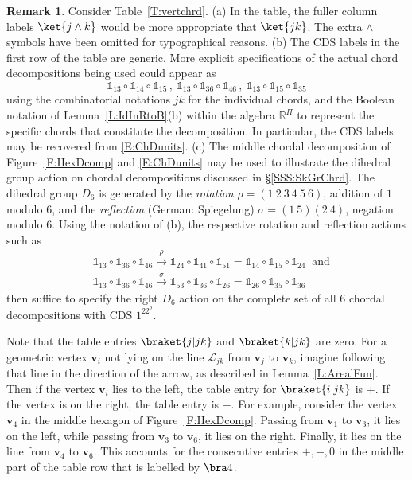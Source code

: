\documentclass[12pt]{amsart}
\theoremstyle{plain}
\theoremstyle{definition}
\newtheorem{remark}[theorem]{Remark}
\numberwithin{equation}{section}
\begin{document}
\begin{remark}\label{R:VerChTab}
Consider Table~\ref{T:vertchrd}.
\vskip 2mm
\noindent
(a)
In the table, the fuller column labels $\ket{j\wedge k}$ would be more appropriate that $\ket{jk}$. The extra $\wedge$ symbols have been omitted for typographical reasons.
\vskip 2mm
\noindent
(b)
The CDS labels in the first row of the table are generic. More explicit specifications of the actual chord decompositions being used could appear as
\begin{equation}\label{E:ChDunits}
\mathds 1_{13}\circ\mathds 1_{14}\circ\mathds 1_{15}\,,\
\mathds 1_{13}\circ\mathds 1_{36}\circ\mathds 1_{46}\,,\
\mathds 1_{13}\circ\mathds 1_{15}\circ\mathds 1_{35}
\end{equation}
using the combinatorial notations $jk$ for the individual chords, and the Boolean notation of Lemma~\ref{L:IdInRtoB}(b) within the algebra $\mathbb R^\Pi$ to represent the specific chords that constitute the decomposition. In particular, the CDS labels may be recovered from \eqref{E:ChDunits}.
\vskip 2mm
\noindent
(c)
The middle chordal decomposition of Figure~\ref{F:HexDcomp} and \eqref{E:ChDunits} may be used to illustrate the dihedral group action on chordal decompositions discussed in \S\ref{SSS:SkGrChrd}. The dihedral group $D_6$ is generated by the \emph{rotation} $\rho=(1\ 2\ 3\ 4\ 5\ 6)$, addition of $1$ modulo $6$, and the \emph{reflection} (German: Spiegelung) $\sigma=(1\ 5)(2\ 4)$, negation modulo $6$. Using the notation of (b), the respective rotation and reflection actions such as
\begin{align*}
&
\mathds 1_{13}\circ\mathds 1_{36}\circ\mathds 1_{46}
\overset{\rho}{\mapsto}
\mathds 1_{24}\circ\mathds 1_{41}\circ\mathds 1_{51}
=
\mathds 1_{14}\circ\mathds 1_{15}\circ\mathds 1_{24}
\
\mbox{ and}
\\
&
\mathds 1_{13}\circ\mathds 1_{36}\circ\mathds 1_{46}
\overset{\sigma}{\mapsto}
\mathds 1_{53}\circ\mathds 1_{36}\circ\mathds 1_{26}
=
\mathds 1_{26}\circ\mathds 1_{35}\circ\mathds 1_{36}
\end{align*}
then suffice to specify the right $D_6$ action on the complete set of all $6$ chordal decompositions with CDS $1^22^2$.
\end{remark}




Note that the table entries $\braket{j|jk}$ and $\braket{k|jk}$ are zero. For a geometric vertex $\mathbf v_i$ not lying on the line $\mathcal L_{jk}$ from $\mathbf v_j$ to $\mathbf v_k$, imagine following that line in the direction of the arrow, as described in Lemma~\ref{L:ArealFun}. Then if the vertex $\mathbf v_i$ lies to the left, the table entry for $\braket{i|jk}$ is $+$. If the vertex is on the right, the table entry is $-$. For example, consider the vertex $\mathbf v_4$ in the middle hexagon of Figure~\ref{F:HexDcomp}. Passing from $\mathbf v_1$ to $\mathbf v_3$, it lies on the left, while passing from $\mathbf v_3$ to $\mathbf v_6$, it lies on the right. Finally, it lies on the line from $\mathbf v_4$ to $\mathbf v_6$. This accounts for the consecutive entries $+,-,0$ in the middle part of the table row that is labelled by $\bra 4$.
\end{document}
